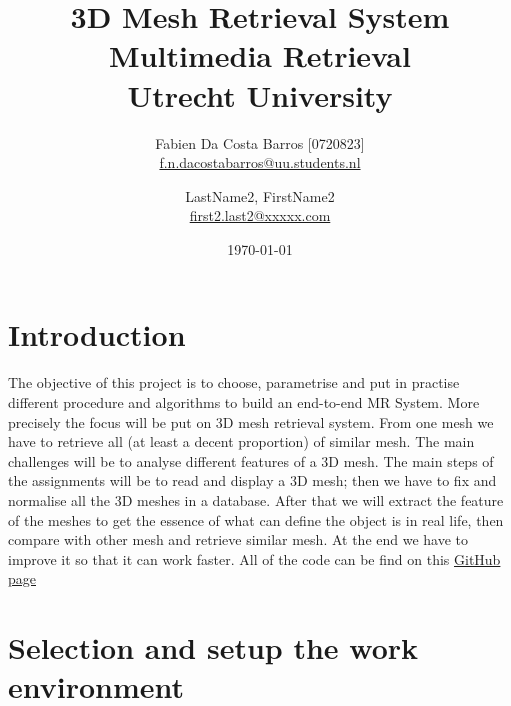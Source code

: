 \documentclass[10pt,twocolumn,letterpaper]{article}
\title{%
  3D Mesh Retrieval System \\
  \large Multimedia Retrieval \\
    Utrecht University}
\author{
  Fabien Da Costa Barros [0720823]\\
  \url{f.n.dacostabarros@uu.students.nl}
  \and
  LastName2, FirstName2\\
  \url{first2.last2@xxxxx.com}
}
\date{\today}
\begin{document}
\maketitle
{}
\section*{Introduction}
The objective of this project is to choose, parametrise and put in practise different procedure and algorithms to build an end-to-end MR System. More precisely the focus will be put on 3D mesh retrieval system. From one mesh we have to retrieve all (at least a decent proportion) of similar mesh. The main challenges will be to analyse different features of a 3D mesh. The main steps of the assignments will be to read and display a 3D mesh; then we have to fix and normalise all the 3D meshes in a database. After that we will extract the feature of the meshes to get the essence of what can define the object is in real life, then compare with other mesh and retrieve similar mesh. At the end we have to improve it so that it can work faster. All of the code can be find on this \href{https://github.com/FDaCostaB/3DMeshRetrievalSystem}{GitHub page}  

\section{Selection and setup the work environment}
\end{document}
